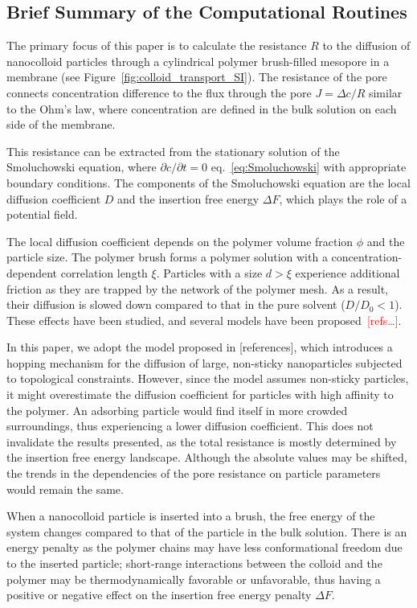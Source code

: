 \documentclass[10pt, a4paper]{article}
\newcommand\todo[1]{\textcolor{red}{#1}}
\begin{document}
\subsection*{Brief Summary of the Computational Routines}
\begin{multicols}{2}

The primary focus of this paper is to calculate the resistance $R$ to the diffusion of nanocolloid particles through a cylindrical polymer brush-filled mesopore in a membrane (see Figure~\ref{fig:colloid_transport_SI}).
The resistance of the pore connects concentration difference to the flux through the pore $J = \Delta c / R$ similar to the Ohm's law, where concentration are defined in the bulk solution on each side of the membrane.

This resistance can be extracted from the stationary solution of the Smoluchowski equation, where $\partial c/\partial t = 0$ eq.~\ref{eq:Smoluchowski} with appropriate boundary conditions.
The components of the Smoluchowski equation are the local diffusion coefficient $D$ and the insertion free energy $\Delta F$, which plays the role of a potential field.

The local diffusion coefficient depends on the polymer volume fraction $\phi$ and the particle size.
The polymer brush forms a polymer solution with a concentration-dependent correlation length $\xi$.
Particles with a size $d > \xi$ experience additional friction as they are trapped by the network of the polymer mesh.
As a result, their diffusion is slowed down compared to that in the pure solvent ($D/D_0 < 1$).
These effects have been studied, and several models have been proposed~\todo{[refs\dots]}.

In this paper, we adopt the model proposed in [references], which introduces a hopping mechanism for the diffusion of large, non-sticky nanoparticles subjected to topological constraints.
However, since the model assumes non-sticky particles, it might overestimate the diffusion coefficient for particles with high affinity to the polymer.
An adsorbing particle would find itself in more crowded surroundings, thus experiencing a lower diffusion coefficient.
This does not invalidate the results presented, as the total resistance is mostly determined by the insertion free energy landscape.
Although the absolute values may be shifted, the trends in the dependencies of the pore resistance on particle parameters would remain the same.

When a nanocolloid particle is inserted into a brush, the free energy of the system changes compared to that of the particle in the bulk solution.
There is an energy penalty as the polymer chains may have less conformational freedom due to the inserted particle; short-range interactions between the colloid and the polymer may be thermodynamically favorable or unfavorable, thus having a positive or negative effect on the insertion free energy penalty $\Delta F$.


\end{multicols}
\end{document}
